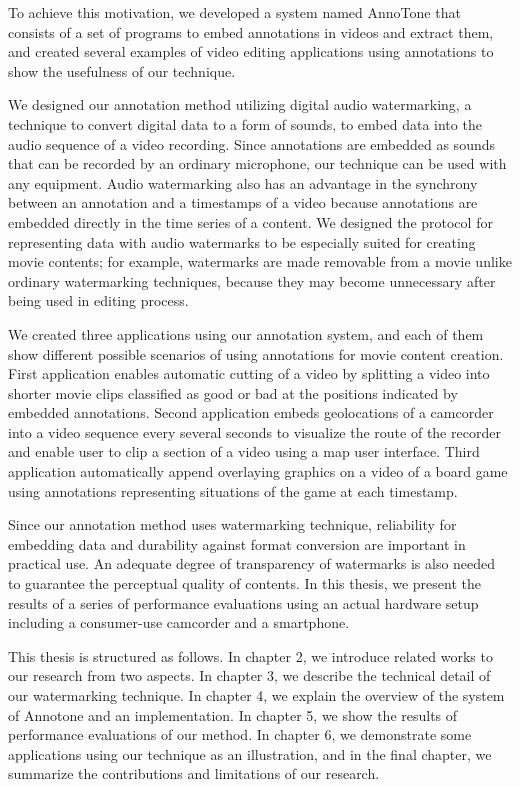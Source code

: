 To achieve this motivation, we developed a system named AnnoTone that consists of a set of programs to embed annotations in videos and extract them, and created several examples of video editing applications using annotations to show the usefulness of our technique.

We designed our annotation method utilizing digital audio watermarking, a technique to convert digital data to a form of sounds, to embed data into the audio sequence of a video recording.
Since annotations are embedded as sounds that can be recorded by an ordinary microphone, our technique can be used with any equipment. %
Audio watermarking also has an advantage in the synchrony between an annotation and a timestamps of a video because annotations are embedded directly in the time series of a content.
We designed the protocol for representing data with audio watermarks to be especially suited for creating movie contents;
for example, watermarks are made removable from a movie unlike ordinary watermarking techniques, because they may become unnecessary after being used in editing process.

We created three applications using our annotation system, and each of them show different possible scenarios of using annotations for movie content creation.
First application enables automatic cutting of a video by splitting a video into shorter movie clips classified as good or bad at the positions indicated by embedded annotations.
Second application embeds geolocations of a camcorder into a video sequence every several seconds to visualize the route of the recorder and enable user to clip a section of a video using a map user interface.
Third application automatically append overlaying graphics on a video of a board game using annotations representing situations of the game at each timestamp.

Since our annotation method uses watermarking technique, reliability for embedding data and durability against format conversion are important in practical use.
An adequate degree of transparency of watermarks is also needed to guarantee the perceptual quality of contents.
In this thesis, we present the results of a series of performance evaluations using an actual hardware setup including a consumer-use camcorder and a smartphone.

This thesis is structured as follows.
In chapter 2, we introduce related works to our research from two aspects.
In chapter 3, we describe the technical detail of our watermarking technique.
In chapter 4, we explain the overview of the system of Annotone and an implementation.
In chapter 5, we show the results of performance evaluations of our method.
In chapter 6, we demonstrate some applications using our technique as an illustration,
and in the final chapter, we summarize the contributions and limitations of our research.
